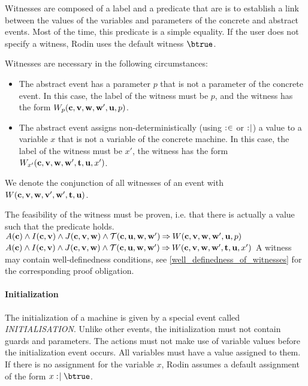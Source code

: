 Witnesses are composed of a label and a predicate that are is to establish a link between the values 
  of the variables and parameters of the concrete and abstract events.
Most of the time, this predicate is a simple equality.
If the user does not specify a witness, Rodin uses the default witness $\btrue$.

Witnesses are necessary in the following circumstances:
\begin{itemize}
\item The abstract event has a parameter $p$ that is not a parameter of the concrete  event.
  In this case, the label of the witness must be $p$, and the witness has the form 
  $W_p(\mathbf{c},{\mathbf{v},\mathbf{w}},\mathbf{w}',\mathbf{u},p)$.
\item The abstract event assigns non-deterministically (using $\mathrel{:\mkern1mu\in}$ or $\mathrel{:\mkern1mu\mid}$) 
  a value to a variable $x$ that is not a variable of the concrete machine.
  In this case, the label of the witness must be $x'$, the witness has the form
  $W_{x'}(\mathbf{c},{\mathbf{v},\mathbf{w}},\mathbf{w}',{\mathbf{t},\mathbf{u}},x')$.
\end{itemize}
We denote the conjunction of all witnesses of an event with $W(\mathbf{c},{\mathbf{v},\mathbf{w}},\mathbf{v}',\mathbf{w}',{\mathbf{t},\mathbf{u}})$.

The feasibility of the witness must be proven, i.e. that there is actually a value such that the
 predicate holds.
%
  {$A(\mathbf{c}) \land I(\mathbf{c},\mathbf{v}) \land J(\mathbf{c},{\mathbf{v},\mathbf{w}}) \land
    \mathcal{T}(\mathbf{c},\mathbf{u},\mathbf{w},\mathbf{w}') \mathbin\Rightarrow
    W(\mathbf{c},{\mathbf{v},\mathbf{w}},\mathbf{w}',\mathbf{u},p)$}
%
  {$A(\mathbf{c}) \land I(\mathbf{c},\mathbf{v}) \land J(\mathbf{c},{\mathbf{v},\mathbf{w}}) \land
    \mathcal{T}(\mathbf{c},\mathbf{u},\mathbf{w},\mathbf{w}') \mathbin\Rightarrow
    W(\mathbf{c},{\mathbf{v},\mathbf{w}},\mathbf{w}',{\mathbf{t},\mathbf{u}},x')$}
A witness may contain well-definedness conditions, see \ref{well_definedness_of_witnesses}
  for the corresponding proof obligation.

\paragraph{Initialization}
\label{initialization}
The initialization of a machine is given by a special event called \textsl{INITIALISATION}.
Unlike other events, the initialization must not contain guards and parameters.
The actions must not make use of variable values before the initialization event occurs.
All variables must have a value assigned to them. If there is no assignment for the variable $x$, Rodin assumes a default assignment of the form $x\bcmsuch \btrue$.

